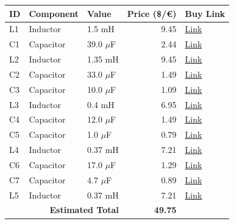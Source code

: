 \documentclass[11pt,a4paper]{report}
\begin{document}
\vspace{0.5cm}
\begin{table}[H]
    \centering
    \renewcommand{\arraystretch}{1.5}
    \begin{tabular}{@{}lllrl@{}}
        \toprule
        \textbf{ID} & \textbf{Component} & \textbf{Value} & \textbf{Price (\$/€)} & \textbf{Buy Link} \\
        \midrule
        L1 & Inductor & 1.5 mH & 9.45 & \href{https://www.soundimports.eu/en/jantzen-audio-000-2171.html}{Link} \\
        C1 & Capacitor & 39.0 $\mu$F & 2.44 & \href{https://www.soundimports.eu/en/jantzen-audio-001-6156.html}{Link} \\
        L2 & Inductor & 1.35 mH & 9.45 & \href{https://www.soundimports.eu/en/jantzen-audio-000-5420.html}{Link} \\
        C2 & Capacitor & 33.0 $\mu$F & 1.49 & \href{https://www.parts-express.com/33uF-100V-Non-Polarized-Capacitor-027-350}{Link} \\
        C3 & Capacitor & 10.0 $\mu$F & 1.09 & \href{https://www.parts-express.com/10uF-100V-Non-Polarized-Capacitor-027-340}{Link} \\
        L3 & Inductor & 0.4 mH & 6.95 & \href{https://www.soundimports.eu/en/dayton-audio-lw18-40.html}{Link} \\
        C4 & Capacitor & 12.0 $\mu$F & 1.49 & \href{https://www.soundimports.eu/en/jantzen-audio-001-6138.html}{Link} \\
        C5 & Capacitor & 1.0 $\mu$F & 0.79 & \href{https://www.parts-express.com/Dayton-Audio-PMPC-1.0-1.0uF-250V-Precision-Audio-Capacitor-027-210}{Link} \\
        L4 & Inductor & 0.37 mH & 7.21 & \href{https://www.parts-express.com/Jantzen-1117-0.37mH-18-AWG-Air-Core-Inductor-255-222}{Link} \\
        C6 & Capacitor & 17.0 $\mu$F & 1.29 & \href{https://www.parts-express.com/17uF-100V-Non-Polarized-Capacitor-027-346}{Link} \\
        C7 & Capacitor & 4.7 $\mu$F & 0.89 & \href{https://www.parts-express.com/4.7uF-100V-Non-Polarized-Capacitor-027-332}{Link} \\
        L5 & Inductor & 0.37 mH & 7.21 & \href{https://www.parts-express.com/Jantzen-1117-0.37mH-18-AWG-Air-Core-Inductor-255-222}{Link} \\
        \midrule
        \multicolumn{3}{r}{\textbf{Estimated Total}} & \textbf{49.75} & \\
        \bottomrule
    \end{tabular}
\end{table}
\end{document}
